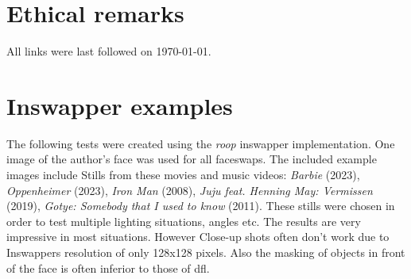 \documentclass[
  a4paper,  %
  twoside,  %
  bibliography=totoc,
  headsepline,
  cleardoublepage=empty,
  parskip=half,
  draft=false
]{scrbook}
\begin{document}
\chapter{Ethical remarks}


\printbibliography
All links were last followed on \today{}.

\appendix
\chapter{Inswapper examples}
\label{chap:insightface-demos}
The following tests were created using the \textit{roop} inswapper implementation. One image of the author's face was used for all faceswaps. The included example images include Stills from these movies and music videos: \textit{Barbie} (2023), \textit{Oppenheimer} (2023), \textit{Iron Man} (2008), \textit{Juju feat. Henning May: Vermissen} (2019), \textit{Gotye: Somebody that I used to know} (2011).
These stills were chosen in order to test multiple lighting situations, angles etc. The results are very impressive in most situations. However Close-up shots often don't work due to Inswappers resolution of only 128x128 pixels. Also the masking of objects in front of the face is often inferior to those of \gls{dfl}.
\end{document}
